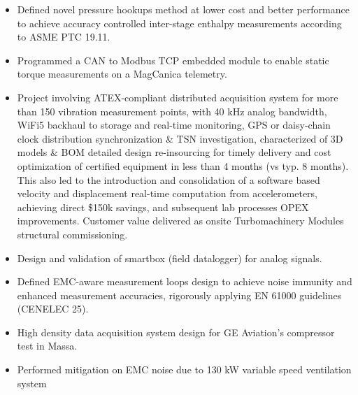 \documentclass[9pt,a4paper,ragged2e,withhyper]{altacv} %
\begin{document}
\begin{paracol}{2}
\begin{itemize}
\item Defined novel pressure hookups method at lower cost and better performance to achieve accuracy controlled inter-stage enthalpy measurements 
according to ASME PTC 19.11. 
\item Programmed a CAN to Modbus TCP embedded module to enable static torque measurements on a MagCanica telemetry.
\end{itemize}
\divider

\begin{itemize}
\item Project involving ATEX-compliant distributed acquisition system for more than 150 vibration measurement points, 
with 40 kHz analog bandwidth, WiFi5 backhaul to storage and real-time monitoring, 
GPS or daisy-chain clock distribution synchronization \& TSN investigation, 
characterized of 3D models \& BOM detailed design re-insourcing for timely delivery and cost optimization of 
certified equipment in less than 4 months (vs typ. 8 months). 
This also led to the introduction and consolidation of a software based velocity and displacement 
real-time computation from accelerometers, achieving direct \$150k savings, and subsequent lab processes OPEX improvements. 
Customer value delivered as onsite Turbomachinery Modules structural commissioning.
\end{itemize}
\divider

\begin{itemize}
\item Design and validation of smartbox (field datalogger) for analog signals. 
\item Defined EMC-aware measurement loops design to achieve noise immunity and enhanced measurement accuracies, 
rigorously applying EN 61000 guidelines (CENELEC 25).
\end{itemize}
\divider

\begin{itemize}
\item High density data acquisition system design for GE Aviation’s compressor test in Massa. 
\item Performed mitigation on EMC noise due to 130 kW variable speed ventilation system
\end{itemize}
\divider


\end{paracol}
\end{document}
